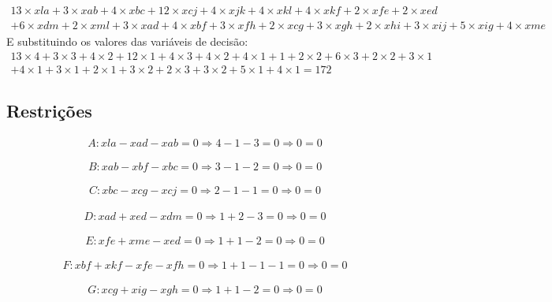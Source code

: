 \documentclass[a4paper]{report}
\begin{document}
\begin{multline}
13\times xla + 3\times xab + 4\times xbc + 12\times xcj + 4\times
xjk + 4\times xkl + 4\times xkf + 2\times xfe + 2\times xed \\ + 6\times xdm +
2\times xml + 3\times xad + 4\times xbf + 3\times xfh + 2\times xcg +
3\times xgh + 2\times xhi + 3\times xij + 5\times xig + 4\times xme
\end{multline}
E substituindo os valores das variáveis de decisão:
\begin{multline}
13\times 4 + 3\times 3 + 4\times 2 + 12\times 1 + 4\times
3 + 4\times 2 + 4\times 1 + 1 + 2\times 2 + 6\times 3 +
2\times 2 + 3\times 1 \\ + 4\times 1 + 3\times 1 + 2\times 1 +
3\times 2 + 2\times 3 + 3\times 2 + 5\times 1 + 4\times 1 
= 172
\end{multline}

\subsection{Restrições}
\begin{multline}
A: xla - xad - xab = 0
\Rightarrow 4 - 1 - 3 = 0 
\Rightarrow 0 = 0
\end{multline}

\begin{multline}
B: xab - xbf - xbc = 0 
\Rightarrow 3 - 1 - 2 = 0
\Rightarrow 0 = 0
\end{multline}

\begin{multline}
C: xbc - xcg - xcj = 0
\Rightarrow 2 - 1 - 1 = 0
\Rightarrow 0 = 0
\end{multline}

\begin{multline}
D: xad + xed - xdm = 0
\Rightarrow 1 + 2 - 3 = 0
\Rightarrow 0 = 0
\end{multline}

\begin{multline}
E: xfe + xme - xed = 0
\Rightarrow 1 + 1 - 2 = 0
\Rightarrow 0 = 0
\end{multline}

\begin{multline}
F: xbf + xkf - xfe - xfh = 0
\Rightarrow 1 + 1 - 1 - 1 = 0
\Rightarrow 0 = 0
\end{multline}

\begin{multline}
G: xcg + xig - xgh = 0
\Rightarrow 1 + 1 - 2 = 0
\Rightarrow 0 = 0
\end{multline}
\end{document}
